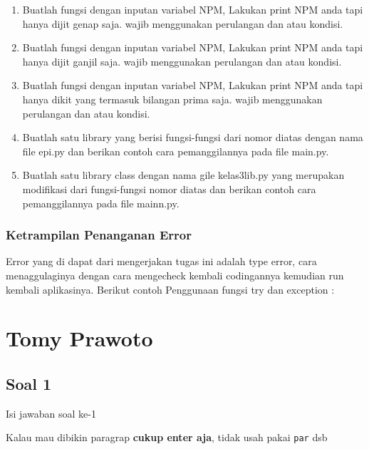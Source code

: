 \begin{enumerate}
    \item Buatlah fungsi dengan inputan variabel NPM, Lakukan print NPM anda tapi hanya dijit genap saja. wajib menggunakan perulangan dan atau kondisi.
        

    \item Buatlah fungsi dengan inputan variabel NPM, Lakukan print NPM anda tapi hanya dijit ganjil saja. wajib menggunakan perulangan dan atau kondisi.
        

    \item Buatlah fungsi dengan inputan variabel NPM, Lakukan print NPM anda tapi hanya dikit yang termasuk bilangan prima saja. wajib menggunakan perulangan dan atau kondisi.
        

    \item Buatlah satu library yang berisi fungsi-fungsi dari nomor diatas dengan nama file epi.py dan berikan contoh cara pemanggilannya pada file main.py.
        

    \item Buatlah satu library class dengan nama gile kelas3lib.py yang merupakan modifikasi dari fungsi-fungsi nomor diatas dan berikan contoh cara pemanggilannya pada file mainn.py.
        

\end{enumerate}

\subsubsection{Ketrampilan Penanganan Error}
Error yang di dapat dari mengerjakan tugas ini adalah type error, cara menaggulaginya dengan cara mengecheck kembali codingannya
kemudian run kembali aplikasinya. Berikut contoh Penggunaan fungsi try dan exception :


\section{Tomy Prawoto}
\subsection{Soal 1}
Isi jawaban soal ke-1

Kalau mau dibikin paragrap \textbf{cukup enter aja}, tidak usah pakai \verb|par| dsb


